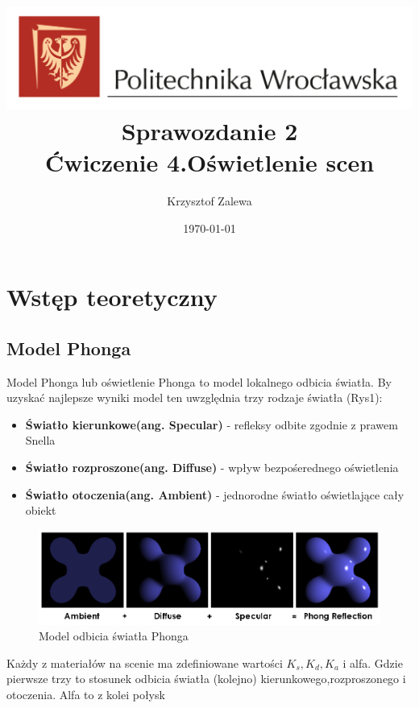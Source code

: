\documentclass{article}
\title{
  \centering
  \includegraphics[width=\textwidth]{images/logo_PWr_kolor_poziom.png}\\
  \fontsize{28pt}{30pt}\selectfont Sprawozdanie 2\\
  \fontsize{14pt}{30pt}\selectfont Ćwiczenie 4.Oświetlenie scen}
\author{Krzysztof Zalewa}
\date{\daymonthyear\today}
\begin{document}
  \maketitle
  \pagebreak
  \tableofcontents
  \section{Wstęp teoretyczny}
  \subsection{Model Phonga}
  Model Phonga lub oświetlenie Phonga to model lokalnego odbicia światła. By
  uzyskać najlepsze wyniki model ten uwzględnia trzy rodzaje światła (Rys1):
  \begin{itemize}
    \item \textbf{Światło kierunkowe(ang. Specular)} - refleksy odbite zgodnie z prawem Snella 
    \item \textbf{Światło rozproszone(ang. Diffuse)} - wpływ bezpośerednego oświetlenia
    \item \textbf{Światło otoczenia(ang. Ambient)} - jednorodne światło oświetlające cały obiekt
  \end{itemize}
  \begin{figure}[ht]
    \centering
    \includegraphics[width=\textwidth]{images/Phong_components_version_4.png}
    \caption{Model odbicia światła Phonga}
    \label{fig:phong}
  \end{figure}
  \FloatBarrier
  Każdy z materiałów na scenie ma zdefiniowane wartości $K_s,K_d,K_a$ 
  i alfa. Gdzie pierwsze trzy to stosunek odbicia światła (kolejno) kierunkowego,rozproszonego i otoczenia. 
  Alfa to z kolei połysk
\end{document}
